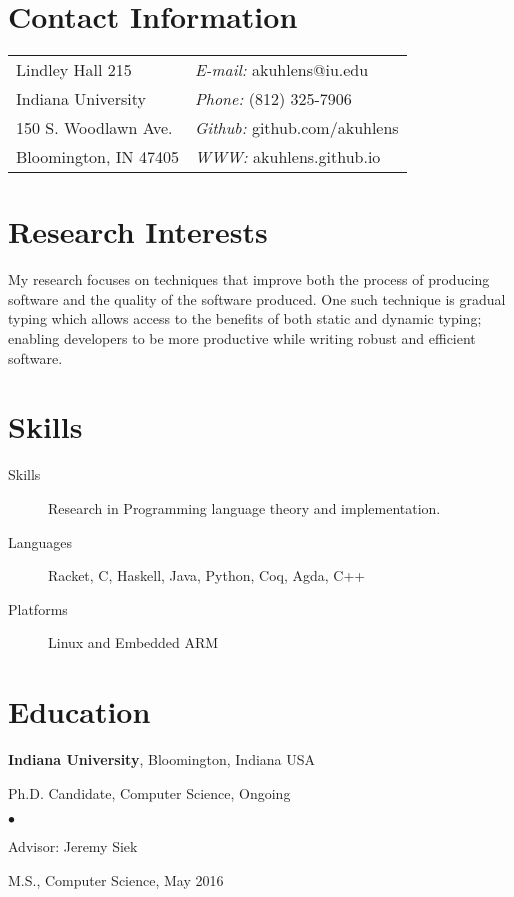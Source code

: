 \documentclass[margin,line]{res}
\newenvironment{list1}{
  \begin{list}{\ding{113}}{%
      \setlength{\itemsep}{0in}
      \setlength{\parsep}{0in} \setlength{\parskip}{0in}
      \setlength{\topsep}{0in} \setlength{\partopsep}{0in} 
      \setlength{\leftmargin}{0.17in}}}{\end{list}}
\newenvironment{list2}{
  \begin{list}{$\bullet$}{%
      \setlength{\itemsep}{0in}
      \setlength{\parsep}{0in} \setlength{\parskip}{0in}
      \setlength{\topsep}{0in} \setlength{\partopsep}{0in} 
      \setlength{\leftmargin}{0.2in}}}{\end{list}}
\begin{document}

\begin{resume}
\section{\sc Contact Information}
\vspace{.05in}
\begin{tabular}{@{}p{2in}p{4in}}
Lindley Hall 215           & {\it E-mail:} akuhlens@iu.edu \\
Indiana University         & {\it Phone:}  (812) 325-7906 \\
150 S. Woodlawn Ave.       & {\it Github:} github.com/akuhlens  \\       
Bloomington, IN 47405      & {\it WWW:} akuhlens.github.io \\     
\end{tabular}

\section{\sc Research Interests}
My research focuses on techniques that improve both the process of
producing software and the quality of the software produced. One such
technique is gradual typing which allows access to the benefits of
both static and dynamic typing; enabling developers to be more
productive while writing robust and efficient software.

\section{\sc Skills}

\begin{description}
\item[Skills] Research in Programming language theory and implementation.
\item[Languages] Racket, C, Haskell, Java, Python, Coq, Agda, C++
\item[Platforms] Linux and Embedded ARM
\end{description}
\section{\sc Education}
{\bf Indiana University}, Bloomington, Indiana USA\\
\vspace*{-.1in}
\begin{list1}
\item[] Ph.D. Candidate, Computer Science, Ongoing
\begin{list2}
\item[] Advisor:  Jeremy Siek
\end{list2}
\vspace*{.05in}
\item[] M.S., Computer Science,  May 2016
\end{list1}


\end{resume}
\end{document}
